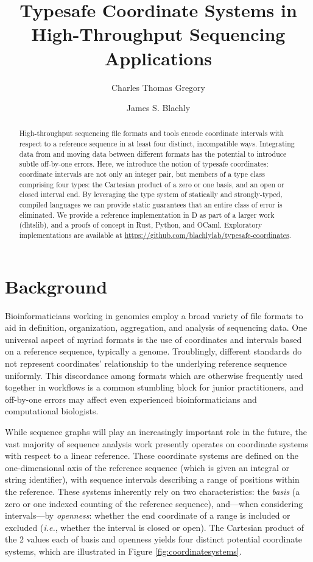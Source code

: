 \documentclass[12pt]{article}
\title{Typesafe Coordinate Systems in High-Throughput Sequencing Applications}
\author[1]{\small Charles Thomas Gregory}
\author[1,2,3]{\small James S. Blachly}
\affil[1]{\footnotesize The Ohio State University Comprehensive Cancer Center}
\affil[2]{\footnotesize The Ohio State University Department of Internal Medicine, Division of Hematology}
\affil[3]{\footnotesize The Ohio State University Department of Biomedical Informatics}
\begin{document}
\maketitle

\begin{abstract}
High-throughput sequencing file formats and tools encode coordinate intervals with respect to a reference sequence in at least four distinct, incompatible ways. Integrating data from and moving data between different formats has the potential to introduce subtle off-by-one errors. Here, we introduce the notion of typesafe coordinates: coordinate intervals are not only an integer pair, but members of a type class comprising four types: the Cartesian product of a zero or one basis, and an open or closed interval end. By leveraging the type system of statically and strongly-typed, compiled languages we can provide static guarantees that an entire class of error is eliminated. We provide a reference implementation in D as part of a larger work (dhtslib), and a proofs of concept in Rust, Python, and OCaml. Exploratory implementations are available at \url{https://github.com/blachlylab/typesafe-coordinates}.
\end{abstract}

\doublespacing

\section*{Background}

Bioinformaticians working in genomics employ a broad variety of file formats to aid in definition, organization, aggregation, and analysis of sequencing data. One universal aspect of myriad formats is the use of coordinates and intervals based on a reference sequence, typically a genome. Troublingly, different standards do not represent coordinates’ relationship to the underlying reference sequence uniformly. This discordance among formats which are otherwise frequently used together in workflows is a common stumbling block for junior practitioners, and off-by-one errors may affect even experienced bioinformaticians and computational biologists.

While  sequence graphs will play an increasingly important role in the future,\cite{Paten01052017} the vast majority of sequence analysis work presently operates on coordinate systems with respect to a linear reference. These coordinate systems are defined on the one-dimensional axis of the reference sequence (which is given an integral or string identifier), with sequence intervals describing a range of positions within the reference. These systems inherently rely on two characteristics: the \textit{basis} (a zero or one indexed counting of the reference sequence), and---when considering intervals---by \textit{openness}: whether the end coordinate of a range is included or excluded (\textit{i.e.}, whether the interval is closed or open). The Cartesian product of the 2 values each of basis and openness yields four distinct potential coordinate systems, which are illustrated in Figure \ref{fig:coordinatesystems}.
\end{document}
